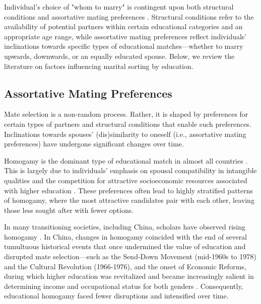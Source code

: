Individual's choice of "whom to marry" is contingent upon both structural conditions and assortative mating preferences \parencite{kalmijnIntermarriageHomogamyCauses1998,oppenheimerTheoryMarriageTiming1988}. Structural conditions refer to the availability of potential partners within certain educational categories and an appropriate age range, while assortative mating preferences reflect individuals' inclinations towards specific types of educational matches—whether to marry upwards, downwards, or an equally educated spouse. Below, we review the literature on factors influencing marital sorting by education.

\subsection{Assortative Mating Preferences}

Mate selection is a non-random process. Rather, it is shaped by preferences for certain types of partners and structural conditions that enable such preferences. Inclinations towards spouses' (dis)similarity to oneself (i.e., assortative mating preferences) have undergone significant changes over time.

Homogamy is the dominant type of educational match in almost all countries \parencite{dehauwReversedGenderGap2017,esteveEndHypergamyGlobal2016,mareFiveDecadesEducational1991,schwartzTrendsVariationAssortative2013}. This is largely due to individuals' emphasis on spousal compatibility in intangible qualities and the competition for attractive socioeconomic resources associated with higher education \parencite{kalmijnStatusHomogamyUnited1991,kalmijnEducationalGradientMarriage2013,mareFiveDecadesEducational1991,smitsEducationalHomogamy651998}. These preferences often lead to highly stratified patterns of homogamy, where the most attractive candidates pair with each other, leaving those less sought after with fewer options.

In many transitioning societies, including China, scholars have observed rising homogamy \parencite{domanskiEducationalHomogamy222007,dongTrendsEducationalAssortative2023,hanTrendsEducationalAssortative2010,katrnakChangePrevalencePreference2020,mullerEducationYouthIntegration2005}. In China, changes in homogamy coincided with the end of several tumultuous historical events that once undermined the value of education and disrupted mate selection—such as the Send-Down Movement (mid-1960s to 1978) and the Cultural Revolution (1966-1976), and the onset of Economic Reforms, during which higher education was revitalized and became increasingly salient in determining income and occupational status for both genders \parencite{hanTrendsEducationalAssortative2010}. Consequently, educational homogamy faced fewer disruptions and intensified over time.

